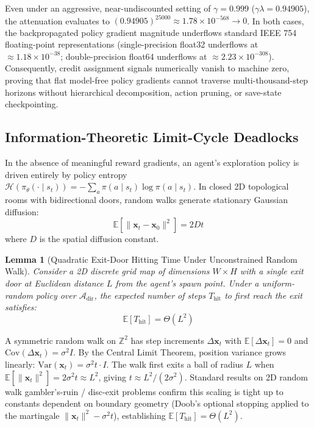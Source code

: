 \documentclass[journal,10pt,twocolumn]{IEEEtran}
\newtheorem{lemma}{Lemma}
\begin{document}
\begin{IEEEproof}
Even under an aggressive, near-undiscounted setting of $\gamma = 0.999$ ($\gamma \lambda = 0.94905$), the attenuation evaluates to $(0.94905)^{25000} \approx 1.78 \times 10^{-568} \to 0$. In both cases, the backpropagated policy gradient magnitude underflows standard IEEE 754 floating-point representations (single-precision float32 underflows at $\approx 1.18 \times 10^{-38}$; double-precision float64 underflows at $\approx 2.23 \times 10^{-308}$). Consequently, credit assignment signals numerically vanish to machine zero, proving that flat model-free policy gradients cannot traverse multi-thousand-step horizons without hierarchical decomposition, action pruning, or save-state checkpointing.
\end{IEEEproof}

\subsection{Information-Theoretic Limit-Cycle Deadlocks}
In the absence of meaningful reward gradients, an agent's exploration policy is driven entirely by policy entropy $\mathcal{H}(\pi_\theta(\cdot \mid s_t)) = - \sum_{a} \pi(a \mid s_t) \log \pi(a \mid s_t)$. In closed 2D topological rooms with bidirectional doors, random walks generate stationary Gaussian diffusion:
\begin{equation}
\mathbb{E}[\|\mathbf{x}_t - \mathbf{x}_0\|^2] = 2 D t
\end{equation}
where $D$ is the spatial diffusion constant.

\begin{lemma}[Quadratic Exit-Door Hitting Time Under Unconstrained Random Walk]
\label{lemma:hitting_time}
Consider a 2D discrete grid map of dimensions $W \times H$ with a single exit door at Euclidean distance $L$ from the agent's spawn point. Under a uniform-random policy over $\mathcal{A}_{\text{dir}}$, the expected number of steps $T_{\text{hit}}$ to first reach the exit satisfies:
\begin{equation}
\mathbb{E}[T_{\text{hit}}] = \Theta(L^2)
\end{equation}
\end{lemma}
\begin{IEEEproof}
A symmetric random walk on $\mathbb{Z}^2$ has step increments $\Delta \mathbf{x}_t$ with $\mathbb{E}[\Delta \mathbf{x}_t] = 0$ and $\text{Cov}(\Delta \mathbf{x}_t) = \sigma^2 I$. By the Central Limit Theorem, position variance grows linearly: $\text{Var}(\mathbf{x}_t) = \sigma^2 t \cdot I$. The walk first exits a ball of radius $L$ when $\mathbb{E}[\|\mathbf{x}_t\|^2] = 2\sigma^2 t \approx L^2$, giving $t \approx L^2 / (2\sigma^2)$. Standard results on 2D random walk gambler's-ruin / disc-exit problems confirm this scaling is tight up to constants dependent on boundary geometry (Doob's optional stopping applied to the martingale $\|\mathbf{x}_t\|^2 - \sigma^2 t$), establishing $\mathbb{E}[T_{\text{hit}}] = \Theta(L^2)$.
\end{IEEEproof}
\end{document}
